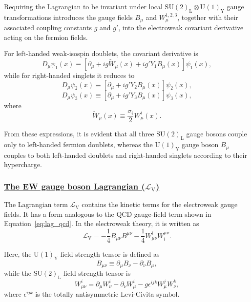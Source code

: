 Requiring the Lagrangian to be invariant under local 
$\mathrm{SU}(2)_{\text{L}} \otimes \mathrm{U}(1)_{\text{Y}}$ gauge transformations
introduces the gauge fields $B_\mu$ and $W_\mu^{1,2,3}$, together with 
their associated coupling constants $g$ and $g'$, into the electroweak 
covariant derivative acting on the fermion fields.

For left-handed weak-isospin doublets, the covariant derivative is
\begin{equation}
D_{\mu} \psi_{1}(x)
\equiv
\left[
\partial_{\mu}
+ i g \widetilde{W}_{\mu}(x)
+ i g' Y_{1} B_{\mu}(x)
\right]
\psi_{1}(x),
\end{equation}
while for right-handed singlets it reduces to
\begin{equation}
D_{\mu} \psi_{2}(x)
\equiv
\left[
\partial_{\mu}
+ i g' Y_{2} B_{\mu}(x)
\right]
\psi_{2}(x),
\end{equation}
\begin{equation}
D_{\mu} \psi_{3}(x)
\equiv
\left[
\partial_{\mu}
+ i g' Y_{3} B_{\mu}(x)
\right]
\psi_{3}(x),
\end{equation}
where
\begin{equation}
\widetilde{W}_{\mu}(x)
\equiv
\frac{\sigma_i}{2} W_{\mu}^{i}(x).
\end{equation}

From these expressions, it is evident that all three $\mathrm{SU}(2)_{\text{L}}$ gauge bosons couple only to left-handed fermion doublets, whereas the $\mathrm{U}(1)_{\text{Y}}$ gauge boson $B_\mu$ couples to both left-handed doublets and right-handed singlets according to their hypercharge.


\subsubsection{\underline{The EW gauge boson Lagrangian ($\mathcal{L}_{\text{V}} $)} }

The Lagrangian term $\mathcal{L}_{\text{V}}$ contains the kinetic terms 
for the electroweak gauge fields. It has a form analogous to the QCD 
gauge-field term shown in Equation~\eqref{eq:lag_qcd}. In the electroweak theory, 
it is written as
\begin{equation}
\label{eq:lag_ew_gauge_1}
\mathcal{L}_{\text{V}}
=
-\frac{1}{4} B_{\mu \nu} B^{\mu \nu}
-\frac{1}{4} W_{\mu \nu}^{i} W_{i}^{\mu \nu}.
\end{equation}

Here, the $\mathrm{U}(1)_{\text{Y}}$ field-strength tensor is defined as
\begin{equation}
\label{eq:U1}
B_{\mu \nu}
\equiv
\partial_{\mu} B_{\nu} - \partial_{\nu} B_{\mu},
\end{equation}
while the $\mathrm{SU}(2)_{\text{L}}$ field-strength tensor is
\begin{equation}
\label{eq:SU2}
W_{\mu \nu}^{i}
=
\partial_{\mu} W_{\nu}^{i}
-
\partial_{\nu} W_{\mu}^{i}
-
g \epsilon^{ijk} W_{\mu}^{j} W_{\nu}^{k},
\end{equation}
where $\epsilon^{ijk}$ is the totally antisymmetric Levi-Civita symbol.

